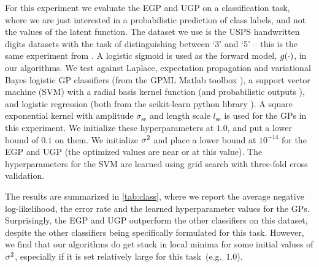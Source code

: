 \documentclass{article} %
\begin{document}
For this experiment we evaluate the EGP and UGP on a %
classification task, where we are just interested in a probabilistic prediction
of class labels, and not the values of the latent function. The dataset we use
is the USPS handwritten digits datasets with the task of distinguishing between
`3' and `5' -- this is the same experiment from \cite{Rasmussen2006}. A
logistic sigmoid is used as the forward model, $g\!\left({{\cdot}}\right)$, in our
algorithms. We test against Laplace, expectation propagation and variational
Bayes logistic GP classifiers (from the GPML Matlab toolbox
\cite{Rasmussen2006}), a support vector machine (SVM) with a radial basis
kernel function (and probabilistic outputs \cite{Platt1999}), and logistic
regression (both from the scikit-learn python library \cite{scikit-learn}). A
square exponential kernel with amplitude $\sigma_\text{se}$ and length scale
$l_\text{se}$ is used for the GPs in this experiment. We initialize these
hyperparameters at $1.0$, and put a lower bound of $0.1$ on them. We initialize
$\sigma^2$ and place a lower bound at $10^{-14}$ for the EGP and UGP (the
optimized values are near or at this value). The hyperparameters for the SVM
are learned using grid search with three-fold cross validation. 


The results are summarized in \autoref{tab:class}, where we report the average
negative log-likelihood, the error rate and the learned hyperparameter values
for the GPs. Surprisingly, the EGP and UGP outperform the other classifiers on
this dataset, despite the other classifiers being specifically formulated for
this task. However, we find that our algorithms do get stuck in local minima
for some initial values of $\sigma^2$, especially if it is set relatively large
for this task~(e.g.~$1.0$).
\end{document}
